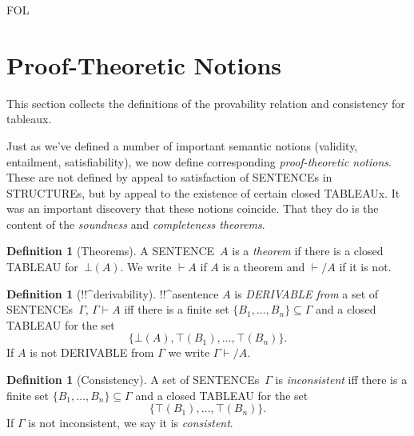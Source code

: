 \documentclass[10pt,a4paper]{article}
\newcommand*{\olup}[1]{\MakeUppercase{#1}}
\theoremstyle{plain}
\theoremstyle{definition}
\newtheorem{defn}[thm]{Definition}
\theoremstyle{remark}
\newenvironment{explain}{}{}
\newenvironment{editorial}{}{}
\newcommand*{\olfileid}[3]{}
\newcommand*{\olsection}[1]{\section*{#1}}
\providecommand{\Proves}{\mathrel{\vdash}}
\providecommand{\sFmla}[2]{#1(#2)}
\providecommand{\True}{\top}
\providecommand{\False}{\bot}
\providecommand{\iftag}[1]{#1}
\providecommand{\iftag}{}
\begin{document}



\iftag{FOL}
      {\olfileid{fol}{tab}{ptn}}
      {\olfileid{pl}{tab}{ptn}}
      
\olsection{Proof-Theoretic Notions}

\begin{editorial}
This section collects the definitions of the provability relation
and consistency for tableaux.
\end{editorial}

\begin{explain}
Just as we've defined a number of important semantic notions
(validity, entailment, satisfiability), we now define corresponding
\emph{proof-theoretic notions}.  These are not defined by appeal to
satisfaction of \olup{sentence}s in \olup{structure}s, but by appeal to the
existence of certain closed \olup{tableau}x.  It was an important
discovery that these notions coincide.  That they do is the content of
the \emph{soundness} and \emph{completeness theorems}.
\end{explain}


\begin{defn}[Theorems]
A \olup{sentence}~$A$ is a \emph{theorem} if there is a closed
\olup{tableau} for~$\sFmla{\False}{A}$.  We write $\Proves A$ if $A$
is a theorem and $\Proves/ A$ if it is not.
\end{defn}

\begin{defn}[!!^{derivability}]
!!^a{sentence} $A$ is \emph{\olup{derivable} from} a set of
\olup{sentence}s~$\Gamma$, $\Gamma \Proves A$ iff there is a
finite set $\{B_1, \dots, B_n\} \subseteq \Gamma$
and a closed \olup{tableau} for the set
\[
\{
  \sFmla{\False}{A},
  \sFmla{\True}{B_1}, \dots,
  \sFmla{\True}{B_n}
  \}.
\]
If $A$ is not \olup{derivable} from $\Gamma$ we write $\Gamma \Proves/
A$.
\end{defn}

\begin{defn}[Consistency]
A set of \olup{sentence}s~$\Gamma$ is \emph{inconsistent} iff there is a
finite set $\{B_1, \dots, B_n\} \subseteq \Gamma$ and a closed
\olup{tableau} for the set
\[
\{
  \sFmla{\True}{B_1}, \dots,
  \sFmla{\True}{B_n}  
  \}.
\]
If $\Gamma$ is not inconsistent, we say it is \emph{consistent}.
\end{defn}
\end{document}
